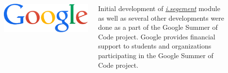 \documentclass[25pt, margin=0mm, innermargin=15mm, blockverticalspace=15mm, colspace=15mm, subcolspace=8mm]{tikzposter}
\newcommand{\gmodule}[1]{\href{http://grass.osgeo.org/grass72/manuals/#1.html}{\emph{#1}}}
\begin{document}
\begin{columns}
{\bigskip

\begin{minipage}{\listlogowidth}
\includegraphics[width=\linewidth]{google}
\end{minipage}
\listhspace
\begin{minipage}{\listtextwidth}
Initial development of \gmodule{i.segement} module as well as several other developments
were done as a part of the Google Summer of Code project.
Google provides financial support to students and organizations participating in the Google Summer of Code project.
\end{minipage}

\vspace{0.2cm}

\textcolor{gray}{
\hrulefill
}

\vspace{0.1cm}

\newcommand{\qrcodesize}{0.05\linewidth}


\begin{center}
\begin{tabular}{c}



\end{tabular}
\end{center}}
\end{columns}
\end{document}
